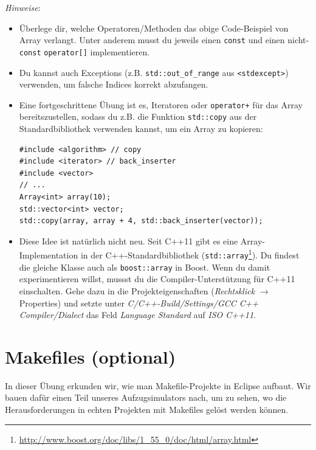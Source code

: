 \emph{Hinweise}:
\begin{itemize}
\item
Überlege dir, welche Operatoren/Methoden das obige Code-Beispiel von Array verlangt.
Unter anderem musst du jeweils einen \texttt{const} und einen nicht-\texttt{const} \texttt{operator[]} implementieren.

\item
Du kannst auch Exceptions (z.B. \texttt{std::out\_of\_range} aus \texttt{<stdexcept>}) verwenden, um falsche Indices korrekt abzufangen.

\item
Eine fortgeschrittene Übung ist es, Iteratoren oder \texttt{operator+} für das Array bereitszustellen, sodass du z.B. die Funktion \texttt{std::copy} aus der Standardbibliothek verwenden kannst, um ein Array zu kopieren:
\begin{lstlisting}
#include <algorithm> // copy
#include <iterator> // back_inserter
#include <vector>
// ...
Array<int> array(10);
std::vector<int> vector;
std::copy(array, array + 4, std::back_inserter(vector));
\end{lstlisting}

\item
Diese Idee ist natürlich nicht neu.
Seit C++11 gibt es eine Array-Implementation in der C++-Standardbibliothek (\texttt{std::array}\footnote{\url{http://www.boost.org/doc/libs/1_55_0/doc/html/array.html}}).
Du findest die gleiche Klasse auch als \texttt{boost::array} in Boost.
Wenn du damit experimentieren willst, mussst du die Compiler-Unterstützung für C++11 einschalten.
Gehe dazu in die Projekteigenschaften (\emph{Rechtsklick} $\to$ Properties) und setzte unter \emph{C/C++-Build/Settings/GCC C++ Compiler/Dialect} das Feld \emph{Language Standard} auf \emph{ISO C++11}.
\end{itemize}



\newpage

\section{Makefiles (optional)}

In dieser Übung erkunden wir, wie man Makefile-Projekte in Eclipse aufbaut.
Wir bauen dafür einen Teil unseres Aufzugsimulators nach, um zu sehen, wo die Herausforderungen in echten Projekten mit Makefiles gelöst werden können.

